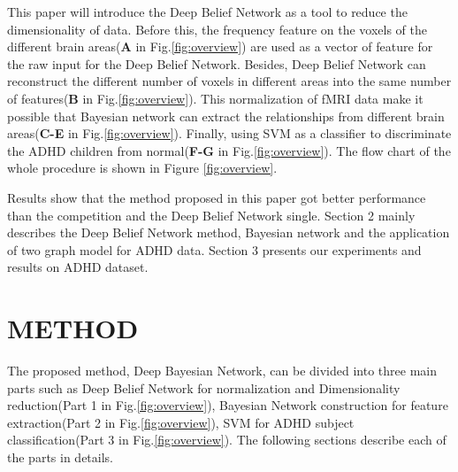 \documentclass[10pt,twocolumn,letterpaper]{article}
\begin{document}
 

This paper will introduce the Deep Belief Network as a tool to reduce the dimensionality of data. Before this, the frequency feature on the voxels of the different brain areas(\textbf{A} in Fig.\ref{fig:overview}) are used as a vector of feature for the raw input for the Deep Belief Network. Besides, Deep Belief Network can reconstruct the different number of voxels in different areas into the same number of features(\textbf{B} in Fig.\ref{fig:overview}). This normalization of fMRI data make it possible that Bayesian network can extract the relationships from different brain areas(\textbf{C-E} in Fig.\ref{fig:overview}). Finally, using SVM as a classifier to discriminate the ADHD children from normal(\textbf{F-G} in Fig.\ref{fig:overview}). The flow chart of the whole procedure is shown in Figure \ref{fig:overview}.

Results show that the method proposed in this paper got better performance than the competition and the Deep Belief Network single. Section 2 mainly describes the Deep Belief Network method, Bayesian network and the application of two graph model for ADHD data. Section 3 presents our experiments and results on ADHD dataset.



\section{METHOD}
The proposed method, Deep Bayesian Network, can be divided into three main parts such as Deep Belief Network for  normalization and Dimensionality reduction(Part 1 in Fig.\ref{fig:overview}), Bayesian Network construction for feature extraction(Part 2 in Fig.\ref{fig:overview}), SVM for ADHD subject classification(Part 3 in Fig.\ref{fig:overview}). The following sections describe each of the parts in details.
\end{document}
